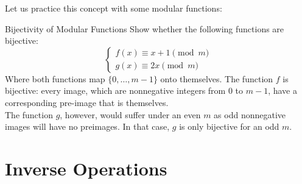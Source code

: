 Let us practice this concept with some modular functions:
\begin{ln-quest}{Bijectivity of Modular Functions}{}
    Show whether the following functions are bijective:
    \[
        \begin{cases}
            f(x) \equiv x + 1\pmod{m} \\
            g(x) \equiv 2x\pmod{m}
        \end{cases}
    \]
    Where both functions map $\{0, \dots, m - 1\}$ onto themselves.
    \tcblower
    The function $f$ is bijective: every image, which are nonnegative integers from $0$ to $m - 1$, have a corresponding pre-image that is themselves. \\
    The function $g$, however, would suffer under an even $m$ as odd nonnegative images will have no preimages. In that case, $g$ is only bijective for an odd $m$.
\end{ln-quest}

\section{Inverse Operations}

